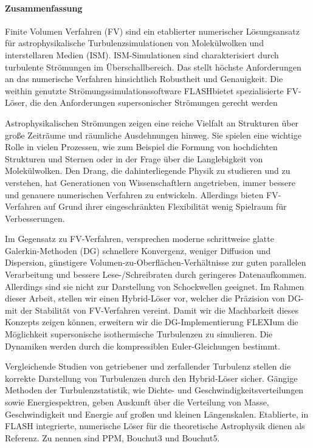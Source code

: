 
\newpage
\paragraph{Zusammenfassung}
Finite Volumen Verfahren (FV) sind ein etablierter numerischer Lösungsansatz für
astrophysikalische Turbulenzsimulationen von Molekülwolken und interstellaren
Medien (ISM). ISM-Simulationen sind charakterisiert durch turbulente Strömungen
im Überschallbereich. Das stellt höchste Anforderungen an das numerische
Verfahren hinsichtlich Robustheit und Genauigkeit. Die weithin genutzte
Strömungssimulationssoftware FLASH\footnotemark[1] bietet spezialisierte FV-Löser,
die den Anforderungen supersonischer Strömungen gerecht werden

Astrophysikalischen Strömungen zeigen eine reiche Vielfalt an Strukturen über
große Zeiträume und räumliche Ausdehnungen hinweg. Sie spielen eine wichtige
Rolle in vielen Prozessen, wie zum Beispiel die Formung von hochdichten
Strukturen und Sternen oder in der Frage über die Langlebigkeit von
Molekülwolken. Den Drang, die dahinterliegende Physik zu studieren und zu
verstehen, hat Generationen von Wissenschaftlern angetrieben, immer bessere und
genauere numerischen Verfahren zu entwickeln. Allerdings bieten FV-Verfahren
auf Grund ihrer eingeschränkten Flexibilität wenig Spielraum für Verbesserungen.

Im Gegensatz zu FV-Verfahren, versprechen moderne schrittweise glatte
Galerkin-Methoden (DG) schnellere Konvergenz, weniger Diffusion und Dispersion,
günstigere Volumen-zu-Oberflächen-Verhältnisse zur guten parallelen
Verarbeitung und bessere Lese-/Schreibraten durch geringeres Datenaufkommen.
Allerdings sind sie nicht zur Darstellung von Schockwellen geeignet. Im Rahmen
dieser Arbeit, stellen wir einen Hybrid-Löser vor, welcher die Präzision von
DG- mit der Stabilität von FV-Verfahren vereint. Damit wir die Machbarkeit
dieses Konzepts zeigen können, erweitern wir die DG-Implementierung
FLEXI\footnotemark[2] um die Möglichkeit supersonische isothermische Turbulenzen
zu simulieren.  Die Dynamiken werden durch die kompressiblen Euler-Gleichungen
bestimmt.

Vergleichende Studien von getriebener und zerfallender Turbulenz stellen die
korrekte Darstellung von Turbulenzen durch den Hybrid-Löser sicher.  Gängige
Methoden der Turbulenzstatistik, wie Dichte- und Geschwindigkeitsverteilungen
sowie Energiespektren, geben Auskunft über die Verteilung von Masse,
Geschwindigkeit und Energie auf großen und kleinen Längenskalen. Etablierte, in
FLASH integrierte, numerische Löser für die theoretische Astrophysik dienen als
Referenz. Zu nennen sind PPM, Bouchut3 und Bouchut5.

